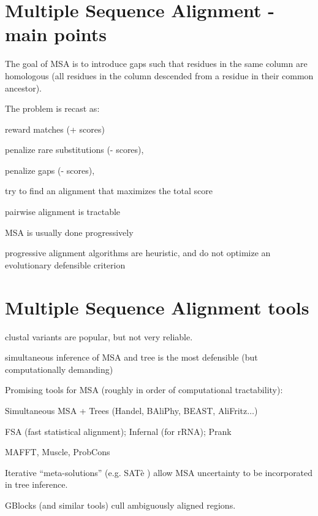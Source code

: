 \documentclass[landscape]{foils}
\begin{document}
\pagecolor{white}
\unitlength=1mm

\myNewSlide
\section*{Multiple Sequence Alignment - main points}
\begin{compactitem}
	\item The goal of MSA is to introduce gaps such that residues in the same column are homologous (all residues in the column descended from a residue in their common ancestor).
	\item The problem is recast as:
		\begin{compactitem}
			\item reward matches (+ scores)
			\item penalize rare substitutions  (- scores),
			\item penalize gaps  (- scores),
			\item try to find an alignment that maximizes the total score
		\end{compactitem}
	\item pairwise alignment is tractable
	\item MSA is usually done progressively
	\item progressive alignment algorithms are heuristic, and do not optimize an evolutionary defensible criterion
\end{compactitem}
\myNewSlide
\section*{Multiple Sequence Alignment tools}
\begin{compactitem}
	\item clustal variants are popular, but not very reliable.
	\item simultaneous inference of MSA and tree is the most defensible (but computationally demanding)
	\item Promising tools for MSA (roughly in order of computational tractability):
	\begin{compactenum}
		\item Simultaneous MSA + Trees (Handel, BAliPhy, BEAST, AliFritz$\ldots$)
		\item FSA (fast statistical alignment); Infernal (for rRNA); Prank
		\item MAFFT, Muscle, ProbCons
	\end{compactenum}
	\item Iterative ``meta-solutions'' (e.g. SAT\`e ) allow MSA uncertainty to be incorporated in tree inference.
	\item GBlocks (and similar tools) cull ambiguously aligned regions.
\end{compactitem}
\end{document}
